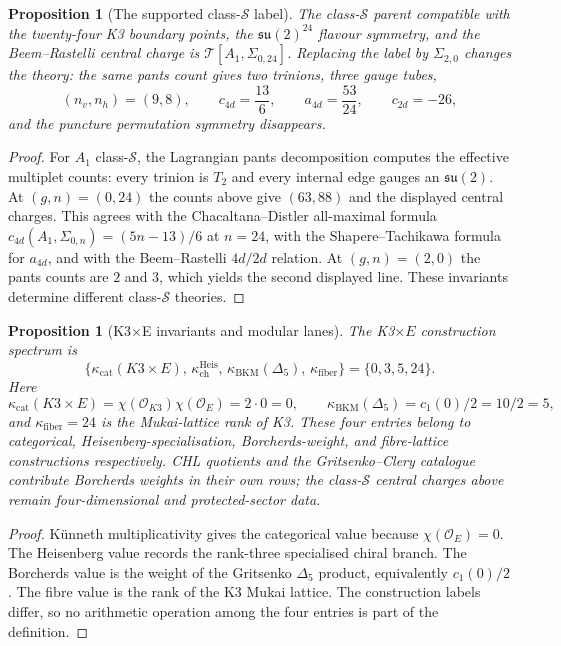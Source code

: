 \documentclass[11pt]{article}
\newtheorem{proposition}[theorem]{Proposition}
\providecommand{\cT}{\mathcal{T}}
\providecommand{\cO}{\mathcal{O}}
\providecommand{\kch}{\kappa_{\mathrm{ch}}}
\providecommand{\kcat}{\kappa_{\mathrm{cat}}}
\providecommand{\kbkm}{\kappa_{\mathrm{BKM}}}
\providecommand{\kfiber}{\kappa_{\mathrm{fiber}}}
\begin{document}
\begin{proposition}[The supported class-\texorpdfstring{$\mathcal S$}{S} label]
\label{prop:class-s-sigma024}
The class-$\mathcal S$ parent compatible with the twenty-four K3
boundary points, the $\mathfrak{su}(2)^{24}$ flavour symmetry, and the
Beem--Rastelli central charge is $\cT[A_1,\Sigma_{0,24}]$. Replacing
the label by $\Sigma_{2,0}$ changes the theory: the same pants count
gives two trinions, three gauge tubes,
\[
  (n_v,n_h)=(9,8),\qquad
  c_{4d}=\frac{13}{6},\qquad
  a_{4d}=\frac{53}{24},\qquad
  c_{2d}=-26,
\]
and the puncture permutation symmetry disappears.
\end{proposition}

\begin{proof}
For $A_1$ class-$\mathcal S$, the Lagrangian pants decomposition
computes the effective multiplet counts: every trinion is $T_2$ and
every internal edge gauges an $\mathfrak{su}(2)$. At $(g,n)=(0,24)$
the counts above give $(63,88)$ and the displayed central charges.
This agrees with the Chacaltana--Distler all-maximal formula
$c_{4d}(A_1,\Sigma_{0,n})=(5n-13)/6$ at $n=24$, with the
Shapere--Tachikawa formula for $a_{4d}$, and with the Beem--Rastelli
$4d/2d$ relation. At $(g,n)=(2,0)$ the pants counts are $2$ and $3$,
which yields the second displayed line. These invariants determine
different class-$\mathcal S$ theories.
\end{proof}

\begin{proposition}[K3\texorpdfstring{$\times$}{x}E invariants and modular lanes]
\label{prop:k3e-invariant-separation}
The K3$\times E$ construction spectrum is
\[
  \bigl\{\kcat(K3\times E),\,
  \kch^{\mathrm{Heis}},\,
  \kbkm(\Delta_5),\,
  \kfiber\bigr\}
  =
  \{0,3,5,24\}.
\]
Here
\[
  \kcat(K3\times E)=
  \chi(\cO_{K3})\chi(\cO_E)=2\cdot0=0,\qquad
  \kbkm(\Delta_5)=c_1(0)/2=10/2=5,
\]
and $\kfiber=24$ is the Mukai-lattice rank of K3. These four entries
belong to categorical, Heisenberg-specialisation, Borcherds-weight,
and fibre-lattice constructions respectively. CHL quotients and the
Gritsenko--Clery catalogue contribute Borcherds weights in their own
rows; the class-$\mathcal S$ central charges above remain
four-dimensional and protected-sector data.
\end{proposition}

\begin{proof}
K\"unneth multiplicativity gives the categorical value because
$\chi(\cO_E)=0$. The Heisenberg value records the rank-three
specialised chiral branch. The Borcherds value is the weight of the
Gritsenko $\Delta_5$ product, equivalently $c_1(0)/2$. The fibre value
is the rank of the K3 Mukai lattice. The construction labels differ,
so no arithmetic operation among the four entries is part of the
definition.
\end{proof}
\end{document}
